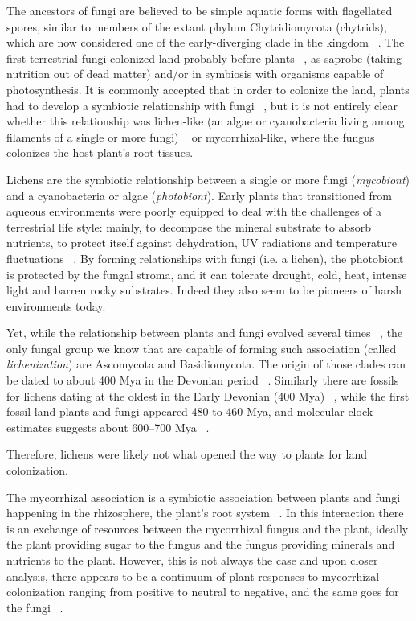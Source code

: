 The ancestors of fungi are believed to be simple aquatic forms with flagellated spores, similar to members of the extant phylum Chytridiomycota (chytrids), which are now considered one of the early-diverging clade in the kingdom ~\citep{james2006}. The first terrestrial fungi colonized land probably before plants ~\citep{heckman2001}, as saprobe (taking nutrition out of dead matter) and\slash or in symbiosis with organisms capable of photosynthesis.
It is commonly accepted that in order to colonize the land, plants had to develop a symbiotic relationship with fungi ~\citep{selosse1998, heckman2001, bonneville2020}, but it is not entirely clear whether this relationship was lichen-like (an algae or cyanobacteria living among filaments of a single or more fungi) ~\citep{spribille2016} or mycorrhizal-like, where the fungus colonizes the host plant's root tissues.

Lichens are the symbiotic relationship between a single or more fungi (\emph{mycobiont}) and a cyanobacteria or algae (\emph{photobiont}). Early plants that transitioned from aqueous environments were poorly equipped to deal with the challenges of a terrestrial life style: mainly, to decompose the mineral substrate to absorb nutrients, to protect itself against dehydration, UV radiations and temperature fluctuations ~\citep{selosse1998, blackwell2000}. By forming relationships with fungi (i.e. a lichen), the photobiont is protected by the fungal stroma, and it can tolerate drought, cold, heat, intense light and barren rocky substrates. Indeed they also seem to be pioneers of harsh environments today.

Yet, while the relationship between plants and fungi evolved several times ~\citep{gargas1995}, the only fungal group we know that are capable of forming such association (called \emph{lichenization}) are Ascomycota and Basidiomycota. The origin of those clades can be dated to about 400 Mya in the Devonian period ~\citep{berbee1993}. Similarly there are fossils for lichens dating at the oldest in the Early Devonian (400 Mya) ~\citep{taylor1997, honegger2013}, while the first fossil land plants and fungi appeared 480 to 460 Mya, and molecular clock estimates suggests about 600--700 Mya ~\citep{berbee1993, heckman2001}.

Therefore, lichens were likely not what opened the way to plants for land colonization.

The mycorrhizal association is a symbiotic association between plants and fungi happening in the rhizosphere, the plant's root system ~\citep{barman2016}. In this interaction there is an exchange of resources between the mycorrhizal fungus and the plant, ideally the plant providing sugar to the fungus and the fungus providing minerals and nutrients to the plant. However, this is not always the case and upon closer analysis, there appears to be a continuum of plant responses to mycorrhizal colonization ranging from positive to neutral to negative, and the same goes for the fungi ~\citep{johnson1997}.

